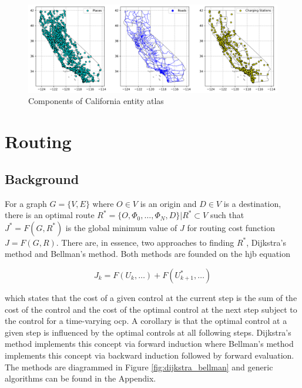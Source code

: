 \documentclass[12pt]{article}
\begin{document}
\begin{figure}[H]
	\centering
	\includegraphics[width = \linewidth]{figs/California_Places_Chargers.png}
	\caption{Components of California entity atlas}
	\label{fig:california_entity_atlas}
\end{figure}

\section*{Routing}

\subsection*{Background}

For a graph $G=\{V,E\}$ where $O\in V$ is an origin and $D\in V$ is a destination, there is an optimal route $R^* = \{O, \Phi_0, \dots, \Phi_N, D\}| R^*\subset V$ such that $J^*=F(G,R^*)$ is the global minimum value of $J$ for routing cost function $J = F(G,R)$. There are, in essence, two approaches to finding $R^*$, Dijkstra's method and Bellman's method. Both methods are founded on the \gls{hjb} equation

\begin{equation}
	J_k = F(U_k,\dots) + F(U^*_{k+1},\dots)
\end{equation}

which states that the cost of a given control at the current step is the sum of the cost of the control and the cost of the optimal control at the next step subject to the control for a time-varying \gls{ocp}. A corollary is that the optimal control at a given step is influenced by the optimal controls at all following steps. Dijkstra's method implements this concept via forward induction where Bellman's method implements this concept via backward induction followed by forward evaluation. The methods are diagrammed in Figure \ref{fig:dijkstra_bellman} and generic algorithms can be found in the Appendix.
\end{document}
